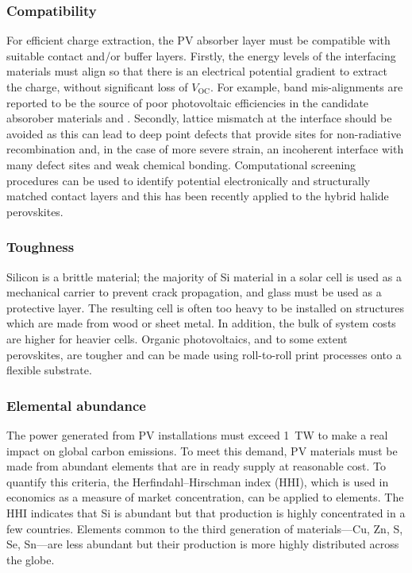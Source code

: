 \subsubsection{Compatibility}
For efficient charge extraction, the PV absorber layer must be compatible with suitable contact and/or buffer layers. Firstly, the energy levels of the interfacing materials must align so that there is an electrical potential gradient to extract the charge, without significant loss of $V_\textrm{OC}$. For example, band mis-alignments are reported to be the source of poor photovoltaic efficiencies in the candidate absorober materials  and .\autocite{Ganose2016} Secondly, lattice mismatch at the interface should be avoided as this can lead to deep point defects that provide sites for non-radiative recombination and, in the case of more severe strain, an incoherent interface with many defect sites and weak chemical bonding. Computational screening procedures can be used to identify potential electronically and structurally matched contact layers and this has been recently applied to the hybrid halide perovskites.\autocite{Butler2016}

\subsubsection{Toughness}
Silicon is a brittle material; the majority of Si material in a solar cell is used as a mechanical carrier to prevent crack propagation, and glass must be used as a protective layer. The resulting cell is often too heavy to be installed on structures which are made from wood or sheet metal. In addition, the bulk of system costs are higher for heavier cells. Organic photovoltaics, and to some extent perovskites, are tougher and can be made using roll-to-roll print processes onto a flexible substrate.

\subsubsection{Elemental abundance}
The power generated from PV installations must exceed \SI{1}{TW} to make a real impact on global carbon emissions.\autocite{Battersby2019} To meet this demand, PV materials must be made from abundant elements that are in ready supply at reasonable cost. To quantify this criteria, the Herfindahl–Hirschman index (HHI), which is used in economics as a measure of market concentration, can be applied to elements. The HHI indicates that Si is abundant but that production is highly concentrated in a few countries. Elements common to the third generation of materials---Cu, Zn, S, Se, Sn---are less abundant but their production is more highly distributed across the globe.\autocite{Gaultois2013}

